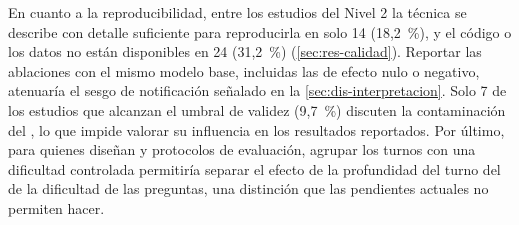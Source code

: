 En cuanto a la reproducibilidad, entre los estudios del Nivel 2 la técnica se describe con detalle suficiente para reproducirla en solo 14 (18,2~\%), y el código o los datos no están disponibles en 24 (31,2~\%) (\cref{sec:res-calidad}). Reportar las ablaciones con el mismo modelo base, incluidas las de efecto nulo o negativo, atenuaría el sesgo de notificación señalado en la \cref{sec:dis-interpretacion}. Solo 7 de los estudios que alcanzan el umbral de validez (9,7~\%) discuten la contaminación del , lo que impide valorar su influencia en los resultados reportados. Por último, para quienes diseñan  y protocolos de evaluación, agrupar los turnos con una dificultad controlada permitiría separar el efecto de la profundidad del turno del de la dificultad de las preguntas, una distinción que las pendientes actuales no permiten hacer.
